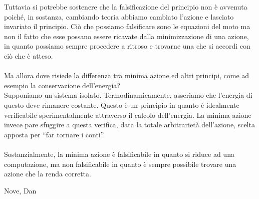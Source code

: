 \documentclass[]{article}
\begin{document}
	Tuttavia si potrebbe sostenere che la falsificazione del principio non è avvenuta poiché, in sostanza, cambiando teoria abbiamo cambiato l'azione e lasciato invariato il principio. Ciò che possiamo falsificare sono le equazioni del moto ma non il fatto che esse possano essere ricavate dalla minimizzazione di una azione, in quanto possiamo sempre procedere a ritroso e trovarne una che si accordi con ciò che è atteso.\\ 
	\\
	Ma allora dove risiede la differenza tra minima azione ed altri principi, come ad esempio la conservazione dell'energia?\\
	Supponiamo un sistema isolato. Termodinamicamente, asseriamo che l'energia di questo deve rimanere costante. Questo è un principio in quanto è idealmente verificabile sperimentalmente attraverso il calcolo dell'energia. La minima azione invece pare sfuggire a questa verifica, data la totale arbitrarietà dell'azione, scelta apposta per \enquote{far tornare i conti}.\\
	\\
	Sostanzialmente, la minima azione è falsificabile in quanto si riduce ad una computazione, ma non falsificabile in quanto è sempre possibile trovare una azione che la renda corretta.
	
	\bigskip 
	\begin{flushright}
		Nove, Dan
	\end{flushright}
\end{document}
